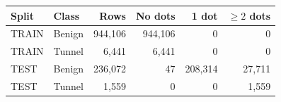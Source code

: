 \centering\footnotesize
\begin{tabular}{@{}llrrrr@{}}
\toprule
Split & Class & Rows & No dots & 1 dot & $\geq2$ dots\\\midrule
TRAIN & Benign & 944,106 & 944,106 & 0 & 0\\
TRAIN & Tunnel & 6,441 & 6,441 & 0 & 0\\
TEST & Benign & 236,072 & 47 & 208,314 & 27,711\\
TEST & Tunnel & 1,559 & 0 & 0 & 1,559\\
\bottomrule
\end{tabular}
